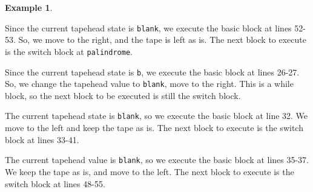 \documentclass{article}
\theoremstyle{definition}
\newtheorem{example}[rules]{Example}
\begin{document}
\begin{example}
\begin{figure}[H]
    \end{figure}
    \noindent Since the current tapehead state is \texttt{blank}, we execute the basic block at lines 52-53. So, we move to the right, and the tape is left as is. The next block to execute is the switch block at \texttt{palindrome}.
    \begin{figure}[H]
        \centering
    \end{figure}
    \noindent Since the current tapehead state is \texttt{b}, we execute the basic block at lines 26-27. So, we change the tapehead value to \texttt{blank}, move to the right. This is a while block, so the next block to be executed is still the switch block.
    \begin{figure}[H]
        \centering
    \end{figure}
    \noindent The current tapehead state is \texttt{blank}, so we execute the basic block at line 32. We move to the left and keep the tape as is. The next block to execute is the switch block at lines 33-41.
    \begin{figure}[H]
        \centering
    \end{figure}
    \noindent The current tapehead value is \texttt{blank}, so we execute the basic block at lines 35-37. We keep the tape as is, and move to the left. The next block to execute is the switch block at lines 48-55.
    \begin{figure}[H]
        \centering
\end{figure}
\end{example}
\end{document}
